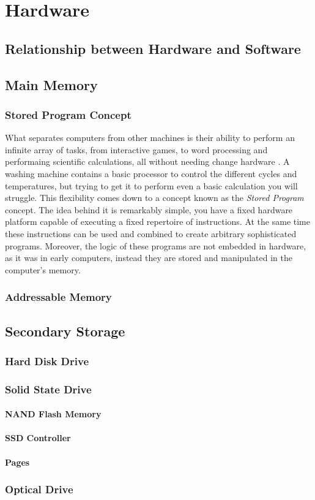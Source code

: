 \chapter{Hardware}
	\section{Relationship between Hardware and Software}
	
	\section{Main Memory}
	
		\subsection{Stored Program Concept}
			What separates computers from other machines is their ability to perform an infinite array of tasks, from interactive games, to word processing and performaing scientific calculations, all without needing change hardware . A washing machine contains a basic processor to control the different cycles and temperatures, but trying to get it to perform even a basic calculation you will struggle. This flexibility comes down to a concept known as the  \textit{Stored Program} concept. The idea behind it is remarkably simple, you have a fixed hardware platform capable of executing a fixed repertoire of instructions. At the same time these instructions can be used and combined to create arbitrary sophisticated programs. Moreover, the logic of these programs are not embedded in hardware, as it was in early computers, instead they are stored and manipulated in the computer's memory.   
		\subsection{Addressable Memory}
		
	\section{Secondary Storage}
		
		\subsection{Hard Disk Drive}
		
		\subsection{Solid State Drive}
			
			\subsubsection{NAND Flash Memory}
			
			\subsubsection{SSD Controller}
			
			\subsubsection{Pages}
			
		\subsection{Optical Drive}
		
	